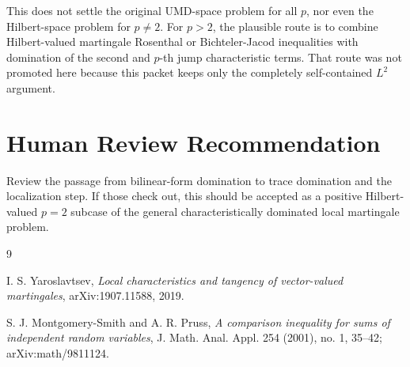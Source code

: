 \documentclass[11pt]{article}
\begin{document}
This does not settle the original UMD-space problem for all \(p\), nor even the
Hilbert-space problem for \(p\neq2\).  For \(p>2\), the plausible route is to
combine Hilbert-valued martingale Rosenthal or Bichteler-Jacod inequalities
with domination of the second and \(p\)-th jump characteristic terms.  That
route was not promoted here because this packet keeps only the completely
self-contained \(L^2\) argument.

\section*{Human Review Recommendation}

Review the passage from bilinear-form domination to trace domination and the
localization step.  If those check out, this should be accepted as a positive
Hilbert-valued \(p=2\) subcase of the general characteristically dominated
local martingale problem.

\begin{thebibliography}{9}

I. S. Yaroslavtsev,
\emph{Local characteristics and tangency of vector-valued martingales},
arXiv:1907.11588, 2019.

S. J. Montgomery-Smith and A. R. Pruss,
\emph{A comparison inequality for sums of independent random variables},
J. Math. Anal. Appl. 254 (2001), no. 1, 35--42;
arXiv:math/9811124.

\end{thebibliography}
\end{document}
